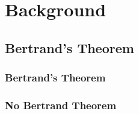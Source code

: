 % 

\section{Background}
\subsection{Bertrand's Theorem}

\begin{frame}\frametitle{Bertrand's Theorem}
\center
\end{frame}

\begin{frame}\frametitle{No Bertrand Theorem}
\end{frame}

\endinput  %
